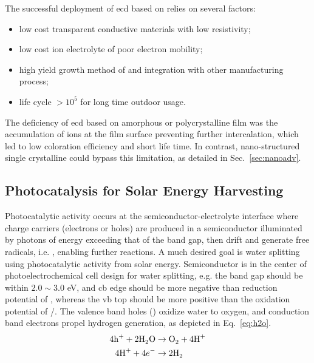 The successful deployment of \gls{ecd} based on  relies on several factors:\cite{Granqvist2000}
\begin{itemize}
\item low cost transparent conductive materials with low resistivity;
\item low cost ion electrolyte of poor electron mobility;
\item high yield growth method of  and integration with other manufacturing process; 
\item life cycle $> 10^5$ for long time outdoor usage.
\end{itemize}
The deficiency of \gls{ecd} based on amorphous or polycrystalline  film was the accumulation of ions at the film surface preventing further intercalation,\cite{Dini1996} which led to low coloration efficiency and short life time. In contrast, nano-structured single crystalline  could bypass this limitation, as detailed in Sec.~\ref{sec:nanoadv}.

\subsection{Photocatalysis for Solar Energy Harvesting}

Photocatalytic activity occurs at the semiconductor-electrolyte interface where charge carriers (electrons or holes) are produced in a semiconductor illuminated by photons of energy exceeding that of the band gap, then drift and generate free radicals, i.e. , enabling further reactions. A much desired goal is water splitting using photocatalytic activity from solar energy. Semiconductor is in the center of photoelectrochemical cell design for water splitting, e.g. the band gap should be within $2.0 \sim 3.0 $ eV, and \gls{cb} edge should be more negative than reduction potential of , whereas the \gls{vb} top should be more positive than the oxidation potential of /.\cite{Osterloh2008,Wang2012} The valence band holes () oxidize water to oxygen, and conduction band electrons propel hydrogen generation, as depicted in Eq.~\ref{eq:h2o}.
\begin{subequations}\label{eq:h2o}
\begin{align}
4\ce{h^+} +  2\ce{H2O} &\rightarrow \ce{O2} + 4\ce{H^+} \label{eq:hervb}\\
4\ce{H^+} +  4e^- &\rightarrow 2\ce{H2} \label{eq:hercb}
\end{align}
\end{subequations}

